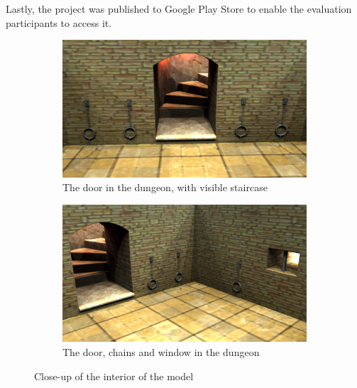 Lastly, the project was published to Google Play Store to enable the evaluation participants to access it.

\begin{figure}[h!]
    \centering
    \begin{subfigure}[h!]{0.7\textwidth}
    	\centering
        \includegraphics[width=\textwidth]{figures/interior0.png}
        \caption{The door in the dungeon, with visible staircase}\label{fig:interior0}
    \end{subfigure}
    \begin{subfigure}[h!]{0.7\textwidth}
    	\centering
        \includegraphics[width=\textwidth]{figures/interior1.png}
        \caption{The door, chains and window in the dungeon}\label{fig:interior1}
    \end{subfigure}
    \caption{Close-up of the interior of the model}\label{interior}
\end{figure}




